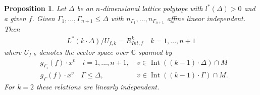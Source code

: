 \documentclass[12pt, english]{article}
\newtheorem{proposition}[definition]{Proposition}
\DeclareMathOperator{\Int}{Int}
\begin{document}
\begin{proposition} \label{proposition_Hodge_comp_Z_f_arbitary_k_dimensions_and_basis}
	Let $\Delta$ be an $n$-dimensional lattice polytope with $l^*(\Delta) > 0$ and a given $f$. Given $\Gamma_1,...,\Gamma_{n+1} \leq \Delta$ with $n_{\Gamma_1},...,n_{\Gamma_{n+1}}$ affine linear independent. Then 
	\begin{align*}
		L^*(k \cdot \Delta) / U_{f,k} = R_{Int,f}^k \quad k=1,...,n+1
	\end{align*}
	where $U_{f,k}$ denotes the vector space over $\mathbb{C}$ spanned by
	\begin{align}
		& g_{\Gamma_i}(f) \cdot x^v \quad i=1,...,n+1, \quad v \in \Int((k-1) \cdot \Delta) \cap M \label{formula_relation_g_Gamma_i_f_the_1}	 \\
		& g_{\Gamma}(f) \cdot x^v \quad \Gamma \leq \Delta, \quad \quad \quad \quad \, \, \, \, v \in \Int((k-1) \cdot \Gamma) \cap M. \label{formula_relation_g_Gamma_i_f_the_2}
	\end{align}
	For $k=2$ these relations are linearly independent.
\end{proposition}
\end{document}

